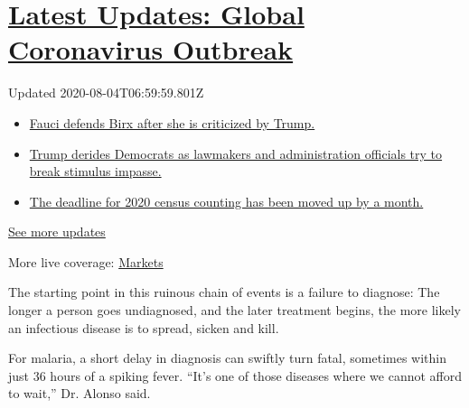 \hypertarget{latest-updates-global-coronavirus-outbreak}{%
\section{\texorpdfstring{\href{https://www.nytimes.com/2020/08/03/world/coronavirus-covid-19.html?action=click\&pgtype=Article\&state=default\&region=MAIN_CONTENT_1\&context=storylines_live_updates}{Latest
Updates: Global Coronavirus
Outbreak}}{Latest Updates: Global Coronavirus Outbreak}}\label{latest-updates-global-coronavirus-outbreak}}

Updated 2020-08-04T06:59:59.801Z

\begin{itemize}
\tightlist
\item
  \href{https://www.nytimes.com/2020/08/03/world/coronavirus-covid-19.html?action=click\&pgtype=Article\&state=default\&region=MAIN_CONTENT_1\&context=storylines_live_updates\#link-4547638f}{Fauci
  defends Birx after she is criticized by Trump.}
\item
  \href{https://www.nytimes.com/2020/08/03/world/coronavirus-covid-19.html?action=click\&pgtype=Article\&state=default\&region=MAIN_CONTENT_1\&context=storylines_live_updates\#link-15e7f995}{Trump
  derides Democrats as lawmakers and administration officials try to
  break stimulus impasse.}
\item
  \href{https://www.nytimes.com/2020/08/03/world/coronavirus-covid-19.html?action=click\&pgtype=Article\&state=default\&region=MAIN_CONTENT_1\&context=storylines_live_updates\#link-e5a2cda}{The
  deadline for 2020 census counting has been moved up by a month.}
\end{itemize}

\href{https://www.nytimes.com/2020/08/03/world/coronavirus-covid-19.html?action=click\&pgtype=Article\&state=default\&region=MAIN_CONTENT_1\&context=storylines_live_updates}{See
more updates}

More live coverage:
\href{https://www.nytimes.com/live/2020/08/03/business/stock-market-today-coronavirus?action=click\&pgtype=Article\&state=default\&region=MAIN_CONTENT_1\&context=storylines_live_updates}{Markets}

The starting point in this ruinous chain of events is a failure to
diagnose: The longer a person goes undiagnosed, and the later treatment
begins, the more likely an infectious disease is to spread, sicken and
kill.

For malaria, a short delay in diagnosis can swiftly turn fatal,
sometimes within just 36 hours of a spiking fever. ``It's one of those
diseases where we cannot afford to wait,'' Dr. Alonso said.

